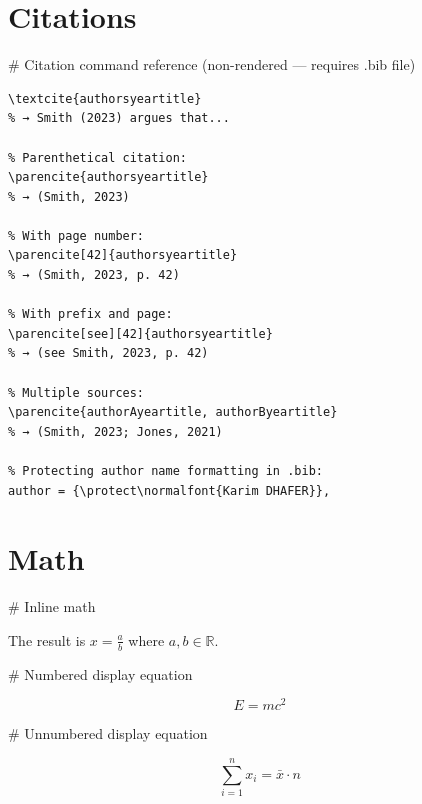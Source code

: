 \documentclass[12pt, a4paper]{article}
\newcommand{\snippetlabel}[1]{%
    \vspace{0.5em}%
    {\small\ttfamily\color{gray} \# #1}%
    \vspace{0.2em}%
}
\begin{document}
\section{Citations}

\snippetlabel{Citation command reference (non-rendered — requires .bib file)}

\begin{lstlisting}[language={[LaTeX]TeX}, basicstyle=\ttfamily\small,
                   frame=single, backgroundcolor=\color{gray!5}]
% Author as subject of sentence:
\textcite{authorsyeartitle}
% → Smith (2023) argues that...

% Parenthetical citation:
\parencite{authorsyeartitle}
% → (Smith, 2023)

% With page number:
\parencite[42]{authorsyeartitle}
% → (Smith, 2023, p. 42)

% With prefix and page:
\parencite[see][42]{authorsyeartitle}
% → (see Smith, 2023, p. 42)

% Multiple sources:
\parencite{authorAyeartitle, authorByeartitle}
% → (Smith, 2023; Jones, 2021)

% Protecting author name formatting in .bib:
author = {\protect\normalfont{Karim DHAFER}},
\end{lstlisting}

\section{Math}

\snippetlabel{Inline math}

\begin{LTXexample}[pos=r, width=0.4]
The result is $x = \frac{a}{b}$
where $a, b \in \mathbb{R}$.
\end{LTXexample}

\snippetlabel{Numbered display equation}

\begin{LTXexample}[pos=r, width=0.4]
\begin{equation}
    E = mc^2
    \label{eq:einstein}
\end{equation}
\end{LTXexample}

\snippetlabel{Unnumbered display equation}

\begin{LTXexample}[pos=r, width=0.4]
\[
    \sum_{i=1}^{n} x_i = \bar{x} \cdot n
\]
\end{LTXexample}
\end{document}

